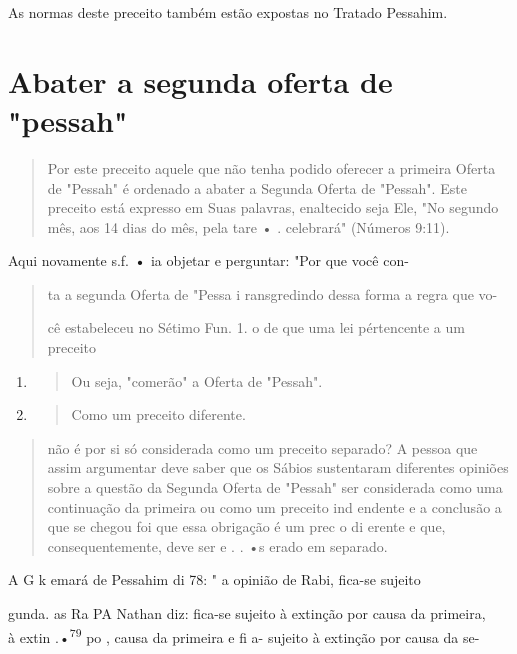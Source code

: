 As normas deste preceito também estão expostas no Tratado Pessahim.

\section{Abater a segunda oferta de "pessah"}

\begin{quote}
Por este preceito aquele que não tenha podido oferecer a primeira Oferta
de "Pessah" é ordenado a abater a Segunda Oferta de "Pessah". Este
preceito está expresso em Suas palavras, enaltecido seja Ele, "No
segundo mês, aos 14 dias do mês, pela tare • . celebrará" (Números
9:11).
\end{quote}

Aqui novamente s.f. \textbf{•} ia objetar e perguntar: "Por que você
con-

\begin{quote}
ta a segunda Oferta de "Pessa i ransgredindo dessa forma a regra que vo-

cê estabeleceu no Sétimo Fun. 1. o de que uma lei
pértencente a um preceito
\end{quote}

\begin{enumerate}
\def\labelenumi{\arabic{enumi}.}
\setcounter{enumi}{75}
\item
 \begin{quote}
 Ou seja, "comerão" a Oferta de "Pessah".
 \end{quote}
\item
 \begin{quote}
 Como um preceito diferente.
 \end{quote}
\end{enumerate}

\begin{quote}


não é por si só considerada como um preceito separado? A pessoa que
assim argumentar deve saber que os Sábios sustentaram diferentes
opiniões sobre a questão da Segunda Oferta de "Pessah" ser considerada
como uma continua­ção da primeira ou como um preceito ind endente e a
conclusão a que se che­gou foi que essa obrigação é um prec o di erente
e que, consequentemente, deve ser e . . •s erado em separado.
\end{quote}

A G k emará de Pessahim di 78: " a opinião de Rabi, fica-se sujeito

gunda. as Ra PA Nathan diz: fica-se sujeito à extinção por causa da
primeira,\\
à extin .•\textsuperscript{79} po , causa da primeira
e fi a- sujeito à extinção por causa da se-

